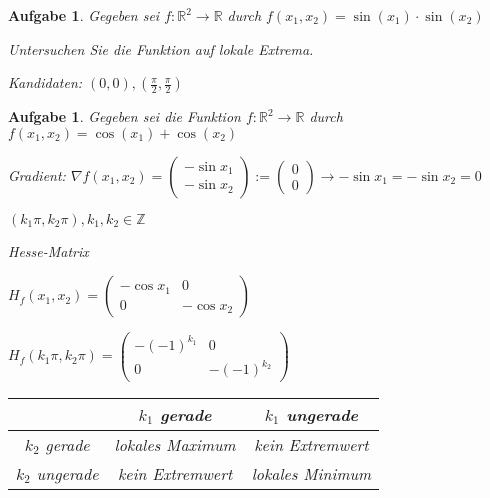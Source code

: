 \documentclass[12pt,a4paper]{scrreprt}
\newtheorem{aufg}[defi]{Aufgabe}
\begin{document}
\begin{aufg}
	Gegeben sei $f:\mathbb{R}^2\to\mathbb{R}$ durch $f(x_1,x_2)=\sin(x_1)\cdot\sin(x_2)$
	
	Untersuchen Sie die Funktion auf lokale Extrema.
	
	Kandidaten: $(0,0),(\frac{\pi}{2},\frac{\pi}{2})$
\end{aufg}

\begin{aufg}
	Gegeben sei die Funktion $f:\mathbb{R}^2\to\mathbb{R}$ durch $f(x_1,x_2)=\cos(x_1)+\cos(x_2)$
	
	Gradient: $\nabla f(x_1,x_2)=\begin{pmatrix}
	-\sin x_1 \\ -\sin x_2
	\end{pmatrix} := \begin{pmatrix}
	0 \\ 0
	\end{pmatrix} \to -\sin x_1 = -\sin x_2 = 0$
	
	$(k_1\pi,k_2\pi), k_1,k_2\in\mathbb{Z}$
	
	Hesse-Matrix
	
	$H_f(x_1,x_2)=\begin{pmatrix}
	-\cos x_1 & 0 \\ 0 & -\cos x_2
	\end{pmatrix}$
	
	$H_f(k_1\pi,k_2\pi)=\begin{pmatrix}
	-(-1)^{k_1} & 0 \\ 0 & -(-1)^{k_2} 
	\end{pmatrix}$
	
	\vspace{1cm}
	\def\arraystretch{1.25}	
	\begin{tabular}{|c|c|c|} \hline
	& $k_1$ gerade & $k_1$ ungerade \\ \hline
	$k_2$ gerade & lokales Maximum & kein Extremwert \\ \hline
	$k_2$ ungerade & kein Extremwert & lokales Minimum \\ \hline
	\end{tabular}
\end{aufg}
\end{document}
